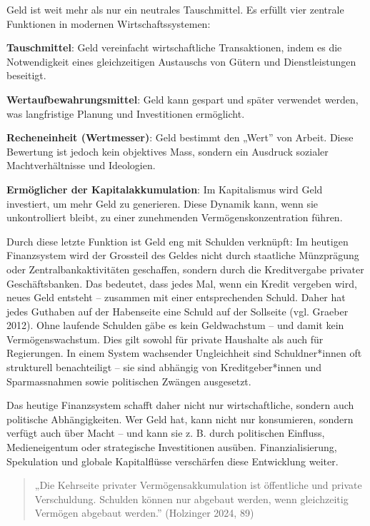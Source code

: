 \documentclass[
  nswissgerman,
  a4paper,
  DIV=11,
  numbers=noendperiod,
  oneside,
  openany]{scrreprt}
\begin{document}
\begin{tcolorbox}[enhanced jigsaw, arc=.35mm, bottomrule=.15mm, bottomtitle=1mm, breakable, colback=white, colbacktitle=quarto-callout-note-color!10!white, colframe=quarto-callout-note-color-frame, coltitle=black, left=2mm, leftrule=.75mm, opacityback=0, opacitybacktitle=0.6, rightrule=.15mm, title={Was wir über Geld und Schulden verstehen müssen}, titlerule=0mm, toprule=.15mm, toptitle=1mm]

Geld ist weit mehr als nur ein neutrales Tauschmittel. Es erfüllt vier
zentrale Funktionen in modernen Wirtschaftssystemen:

\textbf{Tauschmittel}: Geld vereinfacht wirtschaftliche Transaktionen,
indem es die Notwendigkeit eines gleichzeitigen Austauschs von Gütern
und Dienstleistungen beseitigt.

\textbf{Wertaufbewahrungsmittel}: Geld kann gespart und später verwendet
werden, was langfristige Planung und Investitionen ermöglicht.

\textbf{Recheneinheit (Wertmesser)}: Geld bestimmt den „Wert'' von
Arbeit. Diese Bewertung ist jedoch kein objektives Mass, sondern ein
Ausdruck sozialer Machtverhältnisse und Ideologien.

\textbf{Ermöglicher der Kapitalakkumulation}: Im Kapitalismus wird Geld
investiert, um mehr Geld zu generieren. Diese Dynamik kann, wenn sie
unkontrolliert bleibt, zu einer zunehmenden Vermögenskonzentration
führen.

Durch diese letzte Funktion ist Geld eng mit Schulden verknüpft: Im
heutigen Finanzsystem wird der Grossteil des Geldes nicht durch
staatliche Münzprägung oder Zentralbankaktivitäten geschaffen, sondern
durch die Kreditvergabe privater Geschäftsbanken. Das bedeutet, dass
jedes Mal, wenn ein Kredit vergeben wird, neues Geld entsteht --
zusammen mit einer entsprechenden Schuld. Daher hat jedes Guthaben auf
der Habenseite eine Schuld auf der Sollseite (vgl. Graeber 2012). Ohne
laufende Schulden gäbe es kein Geldwachstum -- und damit kein
Vermögenswachstum. Dies gilt sowohl für private Haushalte als auch für
Regierungen. In einem System wachsender Ungleichheit sind
Schuldner*innen oft strukturell benachteiligt -- sie sind abhängig von
Kreditgeber*innen und Sparmassnahmen sowie politischen Zwängen
ausgesetzt.

Das heutige Finanzsystem schafft daher nicht nur wirtschaftliche,
sondern auch politische Abhängigkeiten. Wer Geld hat, kann nicht nur
konsumieren, sondern verfügt auch über Macht -- und kann sie z. B. durch
politischen Einfluss, Medieneigentum oder strategische Investitionen
ausüben. Finanzialisierung, Spekulation und globale Kapitalflüsse
verschärfen diese Entwicklung weiter.

\begin{quote}
„Die Kehrseite privater Vermögensakkumulation ist öffentliche und
private Verschuldung. Schulden können nur abgebaut werden, wenn
gleichzeitig Vermögen abgebaut werden.'' (Holzinger 2024, 89)
\end{quote}

\end{tcolorbox}
\end{document}
